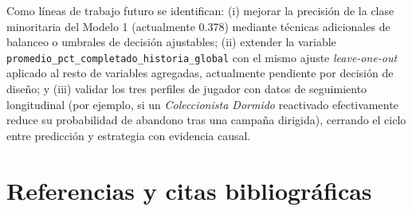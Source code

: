 \documentclass[11pt,letterpaper]{article}
\newcommand{\code}[1]{\texttt{\small #1}}
\begin{document}
Como líneas de trabajo futuro se identifican: (i) mejorar la precisión de la clase minoritaria del Modelo 1 (actualmente 0.378) mediante técnicas adicionales de balanceo o umbrales de decisión ajustables; (ii) extender la variable \code{promedio\_pct\_completado\_historia\_global} con el mismo ajuste \textit{leave-one-out} aplicado al resto de variables agregadas, actualmente pendiente por decisión de diseño; y (iii) validar los tres perfiles de jugador con datos de seguimiento longitudinal (por ejemplo, si un \emph{Coleccionista Dormido} reactivado efectivamente reduce su probabilidad de abandono tras una campaña dirigida), cerrando el ciclo entre predicción y estrategia con evidencia causal.

\section{Referencias y citas bibliográficas}
\end{document}
